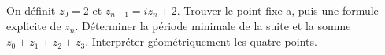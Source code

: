 \documentclass[11pt]{article}
\begin{document}
On définit \(z_{0}=2\) et \(z_{n+1}=i z_{n}+2\). Trouver le point fixe a, puis une formule explicite de \(z_{n}\). Déterminer la période minimale de la suite et la somme \(z_{0}+z_{1}+z_{2}+z_{3}\). Interpréter géométriquement les quatre points.\par
\vspace{5pt}
\end{document}
